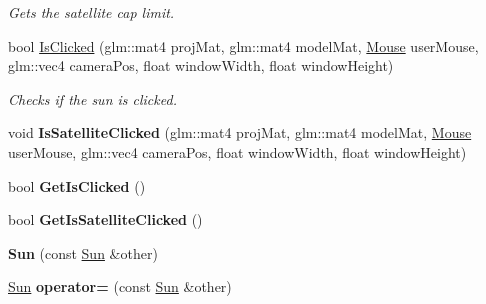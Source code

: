 \begin{DoxyCompactItemize}
\begin{DoxyCompactList}\small\item\em Gets the satellite cap limit. \end{DoxyCompactList}\item 
bool \hyperlink{class_sun_a07ac47d10ff08b43c74de2b704d0ba5a}{Is\-Clicked} (glm\-::mat4 proj\-Mat, glm\-::mat4 model\-Mat, \hyperlink{class_mouse}{Mouse} user\-Mouse, glm\-::vec4 camera\-Pos, float window\-Width, float window\-Height)
\begin{DoxyCompactList}\small\item\em Checks if the sun is clicked. \end{DoxyCompactList}\item 
\hypertarget{class_sun_a5808caa1b90e6a743df2df5ecb9f9850}{void {\bfseries Is\-Satellite\-Clicked} (glm\-::mat4 proj\-Mat, glm\-::mat4 model\-Mat, \hyperlink{class_mouse}{Mouse} user\-Mouse, glm\-::vec4 camera\-Pos, float window\-Width, float window\-Height)}\label{class_sun_a5808caa1b90e6a743df2df5ecb9f9850}

\item 
\hypertarget{class_sun_acf957de19b8643f8282032a4aca00929}{bool {\bfseries Get\-Is\-Clicked} ()}\label{class_sun_acf957de19b8643f8282032a4aca00929}

\item 
\hypertarget{class_sun_a4bff32ca0569f5ba612faf4ffd946228}{bool {\bfseries Get\-Is\-Satellite\-Clicked} ()}\label{class_sun_a4bff32ca0569f5ba612faf4ffd946228}

\item 
\hypertarget{class_sun_a3f7d32a340ac92de0b49b1a804159431}{{\bfseries Sun} (const \hyperlink{class_sun}{Sun} \&other)}\label{class_sun_a3f7d32a340ac92de0b49b1a804159431}

\item 
\hypertarget{class_sun_a511e97ba6dbf11d67f2c7e611626e312}{\hyperlink{class_sun}{Sun} {\bfseries operator=} (const \hyperlink{class_sun}{Sun} \&other)}\label{class_sun_a511e97ba6dbf11d67f2c7e611626e312}

\end{DoxyCompactItemize}
